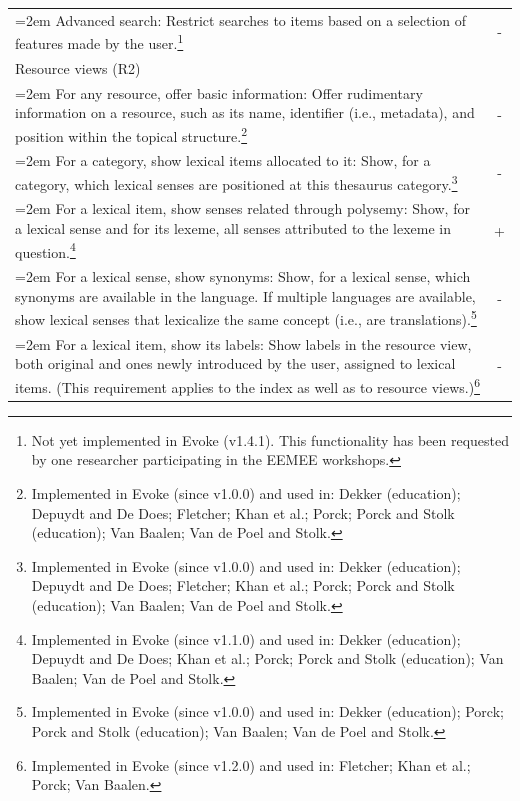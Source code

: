 \begin{longtable}[h!]{>{\raggedright\small}p{4.5in}c}
    \hangindent=2em
    Advanced search: \linebreak
    Restrict searches to items based on a selection of features made by the user.\footnote{Not yet implemented in Evoke (v1.4.1). This functionality has been requested by one researcher participating in the EEMEE workshops.} & - \\

\rowcolor{lightgray!50!}Resource views (R2) &\\

    \hangindent=2em
    For any resource, offer basic information: \linebreak
    Offer rudimentary information on a resource, such as its name, identifier (i.e., metadata), and position within the topical structure.\footnote{Implemented in Evoke (since v1.0.0) and used in: Dekker (education); Depuydt and De Does; Fletcher; Khan et al.; Porck; Porck and Stolk (education); Van Baalen; Van de Poel and Stolk.} & - \\

	\hangindent=2em
	For a category, show lexical items allocated to it: \linebreak
	Show, for a category, which lexical senses are positioned at this thesaurus category.\footnote{Implemented in Evoke (since v1.0.0) and used in: Dekker (education); Depuydt and De Does; Fletcher; Khan et al.; Porck; Porck and Stolk (education); Van Baalen; Van de Poel and Stolk.} & - \\

	\hangindent=2em
	For a lexical item, show senses related through polysemy: \linebreak
	Show, for a lexical sense and for its lexeme, all senses attributed to the lexeme in question.\footnote{Implemented in Evoke (since v1.1.0) and used in: Dekker (education); Depuydt and De Does; Khan et al.; Porck; Porck and Stolk (education); Van Baalen; Van de Poel and Stolk.} & + \\
	
	\hangindent=2em
	For a lexical sense, show synonyms: \linebreak
	Show, for a lexical sense, which synonyms are available in the language. If multiple languages are available, show lexical senses that lexicalize the same concept (i.e., are translations).\footnote{Implemented in Evoke (since v1.0.0) and used in: Dekker (education); Porck; Porck and Stolk (education); Van Baalen; Van de Poel and Stolk.} & - \\
	
    \hangindent=2em
	For a lexical item, show its labels: \linebreak
	Show labels in the resource view, both original and ones newly introduced by the user, assigned to lexical items. 
	(This requirement applies to the index as well as to resource views.)\footnote{Implemented in Evoke (since v1.2.0) and used in: Fletcher; Khan et al.; Porck; Van Baalen.} & - \\


\end{longtable}
